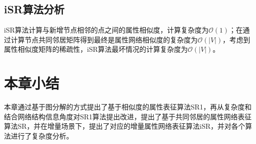 \subsection{iSR算法分析}
iSR算法计算与新增节点相邻的点之间的属性相似度，计算复杂度为$\mathcal{O}(1)$；在通过计算节点共同邻居矩阵得到最终是属性网络相似度的复杂度为$\mathcal{O}(|V|)$，考虑到属性相似度矩阵的稀疏性，iSR算法最坏情况的计算复杂度为$\mathcal{O}(|V|)$。
\section{本章小结}
本章通过基于图分解的方式提出了基于相似度的属性表征算法SR1，再从复杂度和结合网络结构信息角度对SR1算法提出改进，提出了基于共同邻居的属性网络表征算法SR，并在增量场景下，提出了对应的增量属性网络表征算法iSR，并对各个算法进行了复杂度分析。